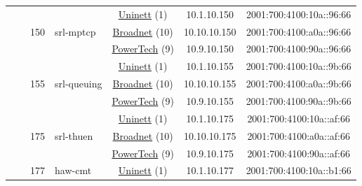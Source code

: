 \begin{small}
\begin{center}
\begin{longtable}{|c|c|c|c|c|c|c|c|}
  &  & \multirow{3}{*}{\tiny{150}} & \multicolumn{1}{|l|}{\multirow{3}{*}{\tiny{srl-mptcp}}} & \multicolumn{2}{|c|}{\tiny{\href{https://www.uninett.no}{Uninett} (1)}} & \tiny{10.1.10.150} & \tiny{2001:700:4100:10a::96:66} \\* \cline{5-5}\cline{6-6}\cline{7-7}\cline{8-8}
  &  &  &  & \multicolumn{2}{|c|}{\tiny{\href{https://www.broadnet.no}{Broadnet} (10)}} & \tiny{10.10.10.150} & \tiny{2001:700:4100:a0a::96:66} \\* \cline{5-5}\cline{6-6}\cline{7-7}\cline{8-8}
  &  &  &  & \multicolumn{2}{|c|}{\tiny{\href{http://www.powertech.no}{PowerTech} (9)}} & \tiny{10.9.10.150} & \tiny{2001:700:4100:90a::96:66} \\* \cline{3-3}\cline{4-4}\cline{5-5}\cline{6-6}\cline{7-7}\cline{8-8}
  &  & \multirow{3}{*}{\tiny{155}} & \multicolumn{1}{|l|}{\multirow{3}{*}{\tiny{srl-queuing}}} & \multicolumn{2}{|c|}{\tiny{\href{https://www.uninett.no}{Uninett} (1)}} & \tiny{10.1.10.155} & \tiny{2001:700:4100:10a::9b:66} \\* \cline{5-5}\cline{6-6}\cline{7-7}\cline{8-8}
  &  &  &  & \multicolumn{2}{|c|}{\tiny{\href{https://www.broadnet.no}{Broadnet} (10)}} & \tiny{10.10.10.155} & \tiny{2001:700:4100:a0a::9b:66} \\* \cline{5-5}\cline{6-6}\cline{7-7}\cline{8-8}
  &  &  &  & \multicolumn{2}{|c|}{\tiny{\href{http://www.powertech.no}{PowerTech} (9)}} & \tiny{10.9.10.155} & \tiny{2001:700:4100:90a::9b:66} \\* \cline{3-3}\cline{4-4}\cline{5-5}\cline{6-6}\cline{7-7}\cline{8-8}
  &  & \multirow{3}{*}{\tiny{175}} & \multicolumn{1}{|l|}{\multirow{3}{*}{\tiny{srl-thuen}}} & \multicolumn{2}{|c|}{\tiny{\href{https://www.uninett.no}{Uninett} (1)}} & \tiny{10.1.10.175} & \tiny{2001:700:4100:10a::af:66} \\* \cline{5-5}\cline{6-6}\cline{7-7}\cline{8-8}
  &  &  &  & \multicolumn{2}{|c|}{\tiny{\href{https://www.broadnet.no}{Broadnet} (10)}} & \tiny{10.10.10.175} & \tiny{2001:700:4100:a0a::af:66} \\* \cline{5-5}\cline{6-6}\cline{7-7}\cline{8-8}
  &  &  &  & \multicolumn{2}{|c|}{\tiny{\href{http://www.powertech.no}{PowerTech} (9)}} & \tiny{10.9.10.175} & \tiny{2001:700:4100:90a::af:66} \\* \cline{3-3}\cline{4-4}\cline{5-5}\cline{6-6}\cline{7-7}\cline{8-8}
  &  & \multirow{3}{*}{\tiny{177}} & \multicolumn{1}{|l|}{\multirow{3}{*}{\tiny{haw-cmt}}} & \multicolumn{2}{|c|}{\tiny{\href{https://www.uninett.no}{Uninett} (1)}} & \tiny{10.1.10.177} & \tiny{2001:700:4100:10a::b1:66} \\* \cline{5-5}\cline{6-6}\cline{7-7}\cline{8-8}

\end{longtable}
\end{center}
\end{small}
